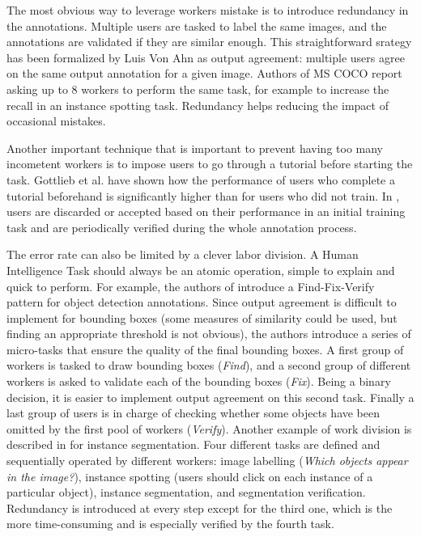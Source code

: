 The most obvious way to leverage workers mistake is to introduce redundancy in the annotations. Multiple users are tasked to label the same images, and the annotations are validated if they are similar enough. This straightforward srategy has been formalized by Luis Von Ahn   \cite{von2008designing} as output agreement: multiple users agree on the same output annotation for a given image. Authors of MS COCO \cite{lin2014microsoft} report asking up to 8 workers to perform the same task, for example to increase the recall in an instance spotting task. Redundancy helps reducing the impact of occasional mistakes. 


Another important technique that is important to prevent having too many incometent workers is to impose users to go through a tutorial before starting the task. Gottlieb et al. \cite{gottlieb2012pushing} have shown how the performance of users who complete a tutorial beforehand is significantly higher than for users who did not train. In \cite{lin2014mscoco}, users are discarded or accepted based on their performance in an initial training task and are periodically verified during the whole annotation process. 


The error rate can also be limited by a clever labor division. A Human Intelligence Task should always be an atomic operation, simple to explain and quick to perform. For example, the authors of \cite{su2012crowdsourcing} introduce a Find-Fix-Verify pattern for object detection annotations. Since output agreement is difficult to implement for bounding boxes (some measures of similarity could be used, but finding an appropriate threshold is not obvious), the authors introduce a series of micro-tasks that ensure the quality of the final bounding boxes. A first group of workers is tasked to draw bounding boxes (\textit{Find}), and a second group of different  workers is asked to validate each of the bounding boxes (\textit{Fix}). Being a binary decision, it is easier to implement output agreement on this second task. Finally a last group of users is in charge of checking whether some objects have been omitted by the first pool of workers (\textit{Verify}). Another example of work division is described in \cite{chen2015microsoft} for instance segmentation. Four different tasks are defined and sequentially operated by different workers: image labelling (\textit{Which objects appear in the image?}), instance spotting (users should click on each instance of a particular object), instance segmentation, and segmentation verification. Redundancy is introduced at every step except for the third one, which is the more time-consuming and is especially verified by the fourth task.  


